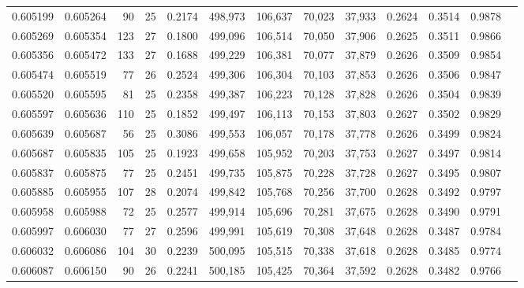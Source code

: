 \begin{tabular}{rrrrrrrrrrrrr}
0.605199 & 0.605264 &  90 &  25 &                                     0.2174 & 498,973 & 106,637 &  70,023 &  37,933 & 0.2624 & 0.3514 & 0.9878 \\
0.605269 & 0.605354 & 123 &  27 &                                     0.1800 & 499,096 & 106,514 &  70,050 &  37,906 & 0.2625 & 0.3511 & 0.9866 \\
0.605356 & 0.605472 & 133 &  27 &                                     0.1688 & 499,229 & 106,381 &  70,077 &  37,879 & 0.2626 & 0.3509 & 0.9854 \\
0.605474 & 0.605519 &  77 &  26 &                                     0.2524 & 499,306 & 106,304 &  70,103 &  37,853 & 0.2626 & 0.3506 & 0.9847 \\
0.605520 & 0.605595 &  81 &  25 &                                     0.2358 & 499,387 & 106,223 &  70,128 &  37,828 & 0.2626 & 0.3504 & 0.9839 \\
0.605597 & 0.605636 & 110 &  25 &                                     0.1852 & 499,497 & 106,113 &  70,153 &  37,803 & 0.2627 & 0.3502 & 0.9829 \\
0.605639 & 0.605687 &  56 &  25 &                                     0.3086 & 499,553 & 106,057 &  70,178 &  37,778 & 0.2626 & 0.3499 & 0.9824 \\
0.605687 & 0.605835 & 105 &  25 &                                     0.1923 & 499,658 & 105,952 &  70,203 &  37,753 & 0.2627 & 0.3497 & 0.9814 \\
0.605837 & 0.605875 &  77 &  25 &                                     0.2451 & 499,735 & 105,875 &  70,228 &  37,728 & 0.2627 & 0.3495 & 0.9807 \\
0.605885 & 0.605955 & 107 &  28 &                                     0.2074 & 499,842 & 105,768 &  70,256 &  37,700 & 0.2628 & 0.3492 & 0.9797 \\
0.605958 & 0.605988 &  72 &  25 &                                     0.2577 & 499,914 & 105,696 &  70,281 &  37,675 & 0.2628 & 0.3490 & 0.9791 \\
0.605997 & 0.606030 &  77 &  27 &                                     0.2596 & 499,991 & 105,619 &  70,308 &  37,648 & 0.2628 & 0.3487 & 0.9784 \\
0.606032 & 0.606086 & 104 &  30 &                                     0.2239 & 500,095 & 105,515 &  70,338 &  37,618 & 0.2628 & 0.3485 & 0.9774 \\
0.606087 & 0.606150 &  90 &  26 &                                     0.2241 & 500,185 & 105,425 &  70,364 &  37,592 & 0.2628 & 0.3482 & 0.9766 \\

\end{tabular}
